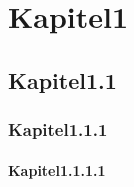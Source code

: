 \documentclass{article}
\title{}
\author{Stefan Redl}
\begin{document}
\maketitle

\tableofcontents
\chapter{Kapitel1}
\section{Kapitel1.1}
\subsection{Kapitel1.1.1}
\subsubsection{Kapitel1.1.1.1}
\end{document}
